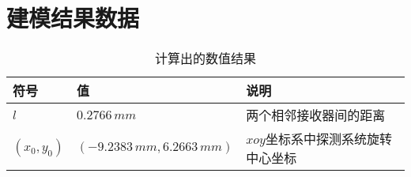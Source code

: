 \section{建模结果数据}

\begin{table}[htbp]
\centering
\caption{计算出的数值结果}
\label{table:values}
\begin{tabular}{@{}lll@{}}
\toprule
符号          & 值     &   说明         \\ \midrule
$l$    & $0.2766\,\si{mm}$     & 两个相邻接收器间的距离                  \\
$(x_0, y_0)$ & $(-9.2383\,\si{mm}, 6.2663\,\si{mm})$  & $xoy$坐标系中探测系统旋转中心坐标 \\ \bottomrule
\end{tabular}
\end{table} 

